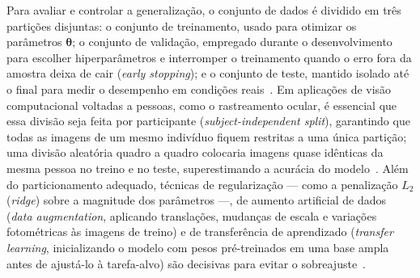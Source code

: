 Para avaliar e controlar a generalização, o conjunto de dados é dividido em três partições disjuntas: o conjunto de treinamento, usado para otimizar os parâmetros $\boldsymbol{\theta}$; o conjunto de validação, empregado durante o desenvolvimento para escolher hiperparâmetros e interromper o treinamento quando o erro fora da amostra deixa de cair (\textit{early stopping}); e o conjunto de teste, mantido isolado até o final para medir o desempenho em condições reais~\cite{goodfellow2016deep}. Em aplicações de visão computacional voltadas a pessoas, como o rastreamento ocular, é essencial que essa divisão seja feita por participante (\textit{subject-independent split}), garantindo que todas as imagens de um mesmo indivíduo fiquem restritas a uma única partição; uma divisão aleatória quadro a quadro colocaria imagens quase idênticas da mesma pessoa no treino e no teste, superestimando a acurácia do modelo~\cite{zhang2015mpiigaze}. Além do particionamento adequado, técnicas de regularização --- como a penalização $L_2$ (\textit{ridge}) sobre a magnitude dos parâmetros ---, de aumento artificial de dados (\textit{data augmentation}, aplicando translações, mudanças de escala e variações fotométricas às imagens de treino) e de transferência de aprendizado (\textit{transfer learning}, inicializando o modelo com pesos pré-treinados em uma base ampla antes de ajustá-lo à tarefa-alvo) são decisivas para evitar o sobreajuste~\cite{goodfellow2016deep}.

